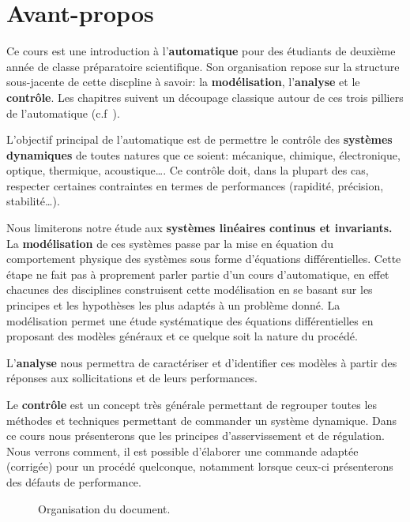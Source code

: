 \chapter*{Avant-propos}

Ce cours est une introduction à l'\textbf{automatique}
pour des étudiants de deuxième année de classe préparatoire scientifique.
Son organisation repose sur la structure sous-jacente de cette discpline à savoir: 
la \textbf{modélisation}, l'\textbf{analyse} et 
le \textbf{contrôle}. Les chapitres suivent un découpage classique
autour de ces trois pilliers de l'automatique (c.f~).

L'objectif principal de l'automatique est de permettre
le contrôle des \textbf{systèmes dynamiques}
de toutes natures que ce soient: mécanique, chimique, 
électronique, optique, thermique, acoustique\ldots.
Ce contrôle doit, dans la plupart des cas, respecter
certaines contraintes en termes de performances (rapidité, précision, stabilité\ldots). 

Nous limiterons notre étude aux \textbf{systèmes linéaires continus et invariants.}
La \textbf{modélisation} de ces systèmes passe par 
la mise en équation du comportement physique des
systèmes sous forme d'équations différentielles.
Cette étape ne fait pas à proprement parler partie d'un cours d'automatique,
en effet chacunes des disciplines construisent cette modélisation 
en se basant sur les principes et les hypothèses les plus adaptés 
à un problème donné.
La modélisation permet une étude systématique des équations
différentielles en proposant des modèles généraux 
et ce quelque soit la nature du procédé.

L'\textbf{analyse} nous permettra de caractériser et d'identifier 
ces modèles à partir des réponses aux sollicitations et de leurs performances.

Le \textbf{contrôle} est un concept très générale permettant de regrouper
toutes les méthodes et techniques permettant de commander un système dynamique.
Dans ce cours nous présenterons que les principes d'asservissement et de régulation.
Nous verrons comment, il est possible d'élaborer une commande adaptée (corrigée) 
pour un procédé quelconque, notamment lorsque ceux-ci présenterons des défauts de performance.


\begin{figure}[!h]
\renewcommand\thefigure{A}
\begin{center}
{
\tikzset{external/export=false}

}
\end{center}
\caption{Organisation du document.\label{fig-diagramme_cours}}
\end{figure}
